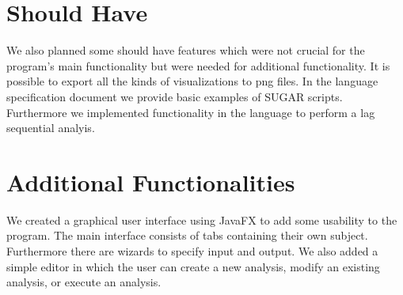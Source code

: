 \section{Should Have}
We also planned some should have features which were not crucial for the program's main functionality but were needed for additional functionality. It is possible to export all the kinds of visualizations to png files. In the language specification document we provide basic examples of SUGAR scripts. Furthermore we implemented functionality in the language to perform a lag sequential analyis.

\section{Additional Functionalities}
We created a graphical user interface using JavaFX to add some usability to the program. The main interface consists of tabs containing their own subject. Furthermore there are wizards to specify input and output. We also added a simple editor in which the user can create a new analysis, modify an existing analysis, or execute an analysis.